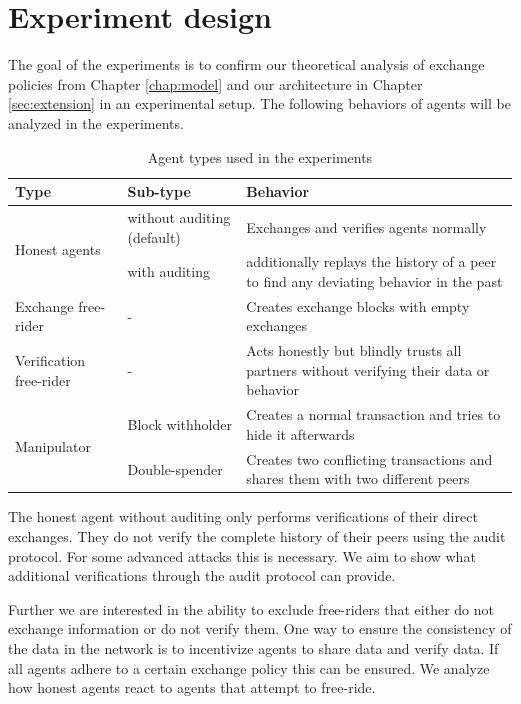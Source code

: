 \section{Experiment design}
The goal of the experiments is to confirm our theoretical analysis of exchange policies from Chapter 
\ref{chap:model} and our architecture in Chapter \ref{sec:extension} in an experimental setup.
The following behaviors of agents will be analyzed in the experiments.

\begin{table}
    \caption{Agent types used in the experiments}
    \label{tab:agent_types}
    \begin{tabular}{p{3cm}|p{3cm}|p{8cm}} \toprule
    \textbf{Type} & \textbf{Sub-type} & \textbf{Behavior} \\ \midrule
    \multirow{2}{3cm}{Honest agents} & without auditing (default) & Exchanges and verifies agents normally \\ \cline{2-3}
    & with auditing & additionally replays the history of a peer to find any deviating behavior in the past \\ \midrule
    Exchange free-rider & - & Creates exchange blocks with empty exchanges \\ 
    \midrule
    Verification free-rider & - & Acts honestly but blindly trusts all partners without verifying their data or behavior \\ \midrule
    \multirow{2}{3cm}{Manipulator } & Block withholder & Creates a normal transaction and tries to hide it afterwards \\ \cline{2-3}
    & Double-spender & Creates two conflicting transactions and shares them with two different peers \\ \bottomrule
    \end{tabular}
\end{table}

The honest agent without auditing only performs verifications of their direct exchanges. They do not
verify the complete history of their peers using the audit protocol. For some advanced attacks this
is necessary. We aim to show what additional verifications through the audit protocol can provide. 

Further we are interested in the ability to exclude free-riders that either do not exchange 
information or do not verify them. One way to ensure the consistency of the data in the network is 
to incentivize agents to share data and verify data. If all agents adhere to a certain exchange policy
this can be ensured. We analyze how honest agents react to agents that attempt to free-ride.

